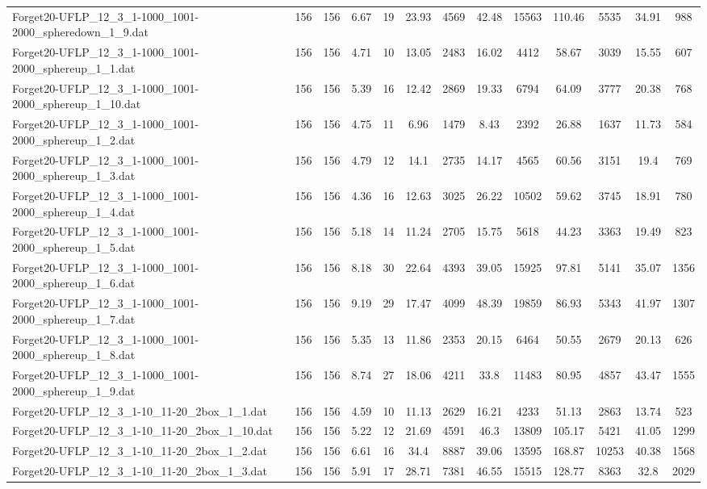 \begin{table}[!ht]
{\begin{tabular}{lcccccccccccc}
Forget20-UFLP\_12\_3\_1-1000\_1001-2000\_spheredown\_1\_9.dat & 156 & 156 & 6.67 & 19 & 23.93 & 4569 & 42.48 & 15563 & 110.46 & 5535 & 34.91 & 988 \\
Forget20-UFLP\_12\_3\_1-1000\_1001-2000\_sphereup\_1\_1.dat & 156 & 156 & 4.71 & 10 & 13.05 & 2483 & 16.02 & 4412 & 58.67 & 3039 & 15.55 & 607 \\
Forget20-UFLP\_12\_3\_1-1000\_1001-2000\_sphereup\_1\_10.dat & 156 & 156 & 5.39 & 16 & 12.42 & 2869 & 19.33 & 6794 & 64.09 & 3777 & 20.38 & 768 \\
Forget20-UFLP\_12\_3\_1-1000\_1001-2000\_sphereup\_1\_2.dat & 156 & 156 & 4.75 & 11 & 6.96 & 1479 & 8.43 & 2392 & 26.88 & 1637 & 11.73 & 584 \\
Forget20-UFLP\_12\_3\_1-1000\_1001-2000\_sphereup\_1\_3.dat & 156 & 156 & 4.79 & 12 & 14.1 & 2735 & 14.17 & 4565 & 60.56 & 3151 & 19.4 & 769 \\
Forget20-UFLP\_12\_3\_1-1000\_1001-2000\_sphereup\_1\_4.dat & 156 & 156 & 4.36 & 16 & 12.63 & 3025 & 26.22 & 10502 & 59.62 & 3745 & 18.91 & 780 \\
Forget20-UFLP\_12\_3\_1-1000\_1001-2000\_sphereup\_1\_5.dat & 156 & 156 & 5.18 & 14 & 11.24 & 2705 & 15.75 & 5618 & 44.23 & 3363 & 19.49 & 823 \\
Forget20-UFLP\_12\_3\_1-1000\_1001-2000\_sphereup\_1\_6.dat & 156 & 156 & 8.18 & 30 & 22.64 & 4393 & 39.05 & 15925 & 97.81 & 5141 & 35.07 & 1356 \\
Forget20-UFLP\_12\_3\_1-1000\_1001-2000\_sphereup\_1\_7.dat & 156 & 156 & 9.19 & 29 & 17.47 & 4099 & 48.39 & 19859 & 86.93 & 5343 & 41.97 & 1307 \\
Forget20-UFLP\_12\_3\_1-1000\_1001-2000\_sphereup\_1\_8.dat & 156 & 156 & 5.35 & 13 & 11.86 & 2353 & 20.15 & 6464 & 50.55 & 2679 & 20.13 & 626 \\
Forget20-UFLP\_12\_3\_1-1000\_1001-2000\_sphereup\_1\_9.dat & 156 & 156 & 8.74 & 27 & 18.06 & 4211 & 33.8 & 11483 & 80.95 & 4857 & 43.47 & 1555 \\
Forget20-UFLP\_12\_3\_1-10\_11-20\_2box\_1\_1.dat & 156 & 156 & 4.59 & 10 & 11.13 & 2629 & 16.21 & 4233 & 51.13 & 2863 & 13.74 & 523 \\
Forget20-UFLP\_12\_3\_1-10\_11-20\_2box\_1\_10.dat & 156 & 156 & 5.22 & 12 & 21.69 & 4591 & 46.3 & 13809 & 105.17 & 5421 & 41.05 & 1299 \\
Forget20-UFLP\_12\_3\_1-10\_11-20\_2box\_1\_2.dat & 156 & 156 & 6.61 & 16 & 34.4 & 8887 & 39.06 & 13595 & 168.87 & 10253 & 40.38 & 1568 \\
Forget20-UFLP\_12\_3\_1-10\_11-20\_2box\_1\_3.dat & 156 & 156 & 5.91 & 17 & 28.71 & 7381 & 46.55 & 15515 & 128.77 & 8363 & 32.8 & 2029 \\

\end{tabular}}
\end{table}
